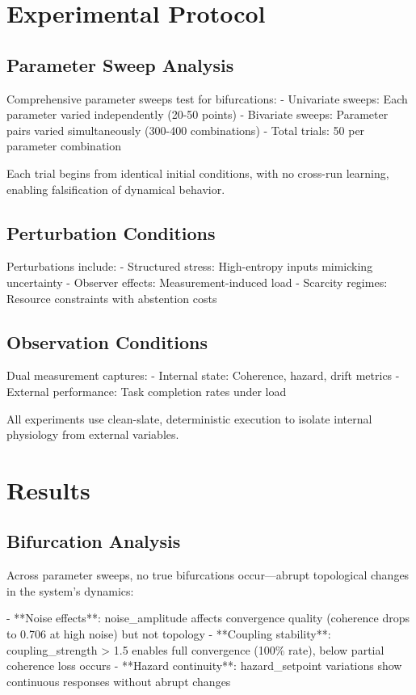 \documentclass[12pt,a4paper]{report}
\begin{document}
\section{Experimental Protocol}

\subsection{Parameter Sweep Analysis}

Comprehensive parameter sweeps test for bifurcations:
- Univariate sweeps: Each parameter varied independently (20-50 points)
- Bivariate sweeps: Parameter pairs varied simultaneously (300-400 combinations)
- Total trials: 50 per parameter combination

Each trial begins from identical initial conditions, with no cross-run learning, enabling falsification of dynamical behavior.

\subsection{Perturbation Conditions}

Perturbations include:
- Structured stress: High-entropy inputs mimicking uncertainty
- Observer effects: Measurement-induced load
- Scarcity regimes: Resource constraints with abstention costs

\subsection{Observation Conditions}

Dual measurement captures:
- Internal state: Coherence, hazard, drift metrics
- External performance: Task completion rates under load

All experiments use clean-slate, deterministic execution to isolate internal physiology from external variables.

\section{Results}

\subsection{Bifurcation Analysis}

Across parameter sweeps, no true bifurcations occur—abrupt topological changes in the system's dynamics:

- **Noise effects**: noise_amplitude affects convergence quality (coherence drops to 0.706 at high noise) but not topology
- **Coupling stability**: coupling_strength > 1.5 enables full convergence (100\% rate), below partial coherence loss occurs
- **Hazard continuity**: hazard_setpoint variations show continuous responses without abrupt changes
\end{document}
